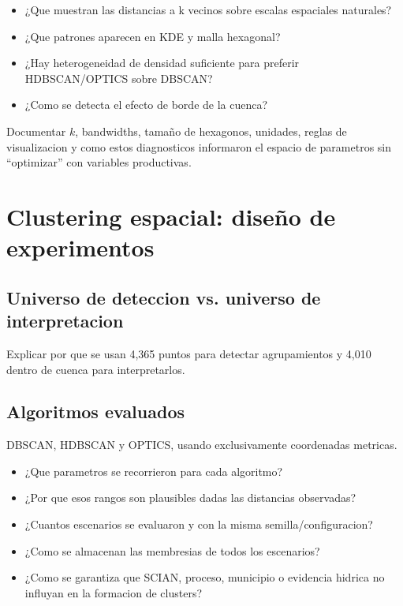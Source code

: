 \documentclass[11pt,letterpaper]{article}
\begin{document}
\begin{preguntas}
\begin{itemize}
    \item ¿Que muestran las distancias a k vecinos sobre escalas espaciales naturales?
    \item ¿Que patrones aparecen en KDE y malla hexagonal?
    \item ¿Hay heterogeneidad de densidad suficiente para preferir HDBSCAN/OPTICS sobre DBSCAN?
    \item ¿Como se detecta el efecto de borde de la cuenca?
\end{itemize}
\end{preguntas}

\begin{evidencia}
Documentar $k$, bandwidths, tamaño de hexagonos, unidades, reglas de visualizacion y como estos diagnosticos informaron el espacio de parametros sin ``optimizar'' con variables productivas.
\end{evidencia}

\section{Clustering espacial: diseño de experimentos}

\subsection{Universo de deteccion vs. universo de interpretacion}
Explicar por que se usan 4,365 puntos para detectar agrupamientos y 4,010 dentro de cuenca para interpretarlos.

\subsection{Algoritmos evaluados}
DBSCAN, HDBSCAN y OPTICS, usando exclusivamente coordenadas metricas.

\begin{preguntas}
\begin{itemize}
    \item ¿Que parametros se recorrieron para cada algoritmo?
    \item ¿Por que esos rangos son plausibles dadas las distancias observadas?
    \item ¿Cuantos escenarios se evaluaron y con la misma semilla/configuracion?
    \item ¿Como se almacenan las membresias de todos los escenarios?
    \item ¿Como se garantiza que SCIAN, proceso, municipio o evidencia hidrica no influyan en la formacion de clusters?
\end{itemize}
\end{preguntas}
\end{document}
